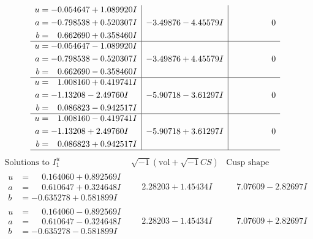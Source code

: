 \documentclass[1p]{elsarticle_modified}
\theoremstyle{definition}
\newcommand{\I}{\sqrt{-1}}
\begin{document}
$$\begin{array}{c|c|c}
\begin{aligned}
u &= -0.054647 + 1.089920 I \\
a &= -0.798538 + 0.520307 I \\
b &= \phantom{-}0.662690 + 0.358460 I\end{aligned}
 & -3.49876 - 4.45579 I & \phantom{-0.000000 } 0 \\ \hline\begin{aligned}
u &= -0.054647 - 1.089920 I \\
a &= -0.798538 - 0.520307 I \\
b &= \phantom{-}0.662690 - 0.358460 I\end{aligned}
 & -3.49876 + 4.45579 I & \phantom{-0.000000 } 0 \\ \hline\begin{aligned}
u &= \phantom{-}1.008160 + 0.419741 I \\
a &= -1.13208 - 2.49760 I \\
b &= \phantom{-}0.086823 - 0.942517 I\end{aligned}
 & -5.90718 - 3.61297 I & \phantom{-0.000000 } 0 \\ \hline\begin{aligned}
u &= \phantom{-}1.008160 - 0.419741 I \\
a &= -1.13208 + 2.49760 I \\
b &= \phantom{-}0.086823 + 0.942517 I\end{aligned}
 & -5.90718 + 3.61297 I & \phantom{-0.000000 } 0\\
 \hline 
 \end{array}$$\newpage$$\begin{array}{c|c|c}  
\text{Solutions to }I^u_{1}& \I (\text{vol} + \sqrt{-1}CS) & \text{Cusp shape}\\
 \hline 
\begin{aligned}
u &= \phantom{-}0.164060 + 0.892569 I \\
a &= \phantom{-}0.610647 + 0.324648 I \\
b &= -0.635278 + 0.581899 I\end{aligned}
 & \phantom{-}2.28203 + 1.45434 I & \phantom{-}7.07609 - 2.82697 I \\ \hline\begin{aligned}
u &= \phantom{-}0.164060 - 0.892569 I \\
a &= \phantom{-}0.610647 - 0.324648 I \\
b &= -0.635278 - 0.581899 I\end{aligned}
 & \phantom{-}2.28203 - 1.45434 I & \phantom{-}7.07609 + 2.82697 I \\ \hline\begin{aligned}

\end{aligned}
\end{array}$$
\end{document}
